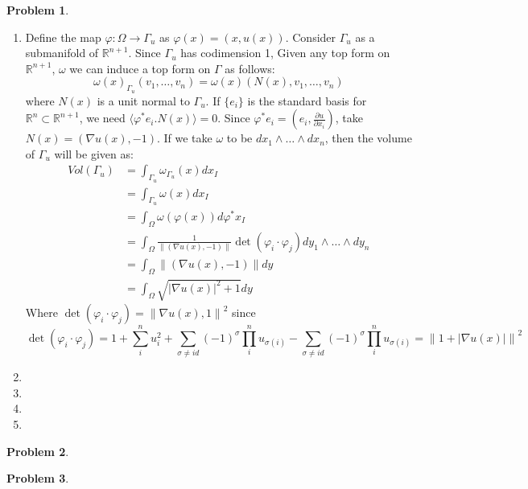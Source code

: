 \documentclass[12pt, a4paper]{article}
\title{}
\author{A.N.}
\date{\today}
\newtheorem{problem}{Problem}
\theoremstyle{definition}
\newcommand{\penum}{ \begin{enumerate}[label=\bf(\alph*), leftmargin=0pt]}
\newcommand{\epenum}{ \end{enumerate} }
\newcommand{\R}{\mathbb{R}}                           %
\newcommand{\grad}{\nabla}
\newcommand{\lan}{\langle}
\newcommand{\ran}{\rangle}
\newcommand{\norm}[1]{\left\lVert#1\right\rVert}
\newcommand{\inn}[1]{\lan#1\ran}
\begin{document}
\begin{problem}
\end{problem}
\penum
\item Define the map $\varphi : \Omega \to \Gamma_u$ as $\varphi(x) = (x,u(x))$. Consider $\Gamma_u$ as a submanifold of $\R^{n+1}$. Since $\Gamma_u$ has codimension 1, Given any top form on $\R^{n+1}$, $\omega$ we can induce a top form on $\Gamma$ as follows: 
$$\omega(x)_{\Gamma_u} (v_1, \dots , v_n) = \omega(x)(N(x) , v_1 , \dots , v_n)$$
where $N(x)$ is a unit normal to $\Gamma_u$. If $\{e_i\}$ is the standard basis for $\R^n \subset\R^{n+1}$, we need $ \inn{\varphi^\ast e_i. N(x) } = 0$. Since $\varphi^\ast e_i = \left(e_i, \frac{\partial u}{\partial x_i} \right)$, take $N(x) = (\grad u(x), -1)$.
If we take $\omega$ to be $dx_1 \wedge \dots \wedge dx_{n}$, then the volume of $\Gamma_u$ will be given as: 
\begin{align*}
Vol(\Gamma_u) &= \int_{\Gamma_u} \omega_{\Gamma_u}(x) dx_{I} 
\\ &= \int_{\Gamma_u} \omega(x)dx_I 
\\ &= \int_\Omega \omega(\varphi(x))d \varphi^\ast x_I  
\\& = \int_\Omega \frac{1}{\norm{(\grad u(x) , -1)}} \det ( \varphi_i \cdot \varphi_j ) dy_1 \wedge \dots  \wedge dy_n 
\\ & = \int_\Omega \norm{(\grad u(x), -1)} dy
\\ & = \int_\Omega \sqrt{|\grad u (x) |^2 + 1} dy
\end{align*} 
Where $\det ( \varphi_i \cdot \varphi_j ) = \norm{\grad u(x), 1}^2$ since 
$$\det ( \varphi_i \cdot \varphi_j ) = 1 + \sum_i^n u_i^2 + \sum_{\sigma \neq id} (-1)^\sigma \prod_{i}^{n} u_{\sigma(i)} - \sum_{\sigma \neq id} (-1)^\sigma \prod_{i}^{n} u_{\sigma(i)} = \norm{1+ |\grad u(x)|}^2 $$
\item
\item 
\item 
\item 
\epenum

\newpage
\begin{problem}
\end{problem}
\newpage
\begin{problem}
\end{problem}
\newpage
\end{document}
